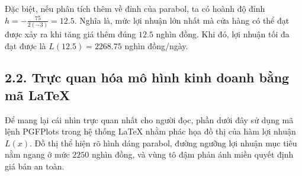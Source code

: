 \documentclass[14pt, a4paper, oneside]{extreport}
\begin{document}
Đặc biệt, nếu phân tích thêm về đỉnh của parabol, ta có hoành độ đỉnh $h = -\frac{75}{2(-3)} = 12.5$. Nghĩa là, mức lợi nhuận lớn nhất mà cửa hàng có thể đạt được xảy ra khi tăng giá thêm đúng $12.5$ nghìn đồng. Khi đó, lợi nhuận tối đa đạt được là $L(12.5) = 2268.75$ nghìn đồng/ngày.

\subsection*{2.2. Trực quan hóa mô hình kinh doanh bằng mã LaTeX}

Để mang lại cái nhìn trực quan nhất cho người đọc, phần dưới đây sử dụng mã lệnh PGFPlots trong hệ thống LaTeX nhằm phác họa đồ thị của hàm lợi nhuận $L(x)$. Đồ thị thể hiện rõ hình dáng parabol, đường ngưỡng lợi nhuận mục tiêu nằm ngang ở mức $2250$ nghìn đồng, và vùng tô đậm phản ánh miền quyết định giá bán an toàn.
\end{document}
